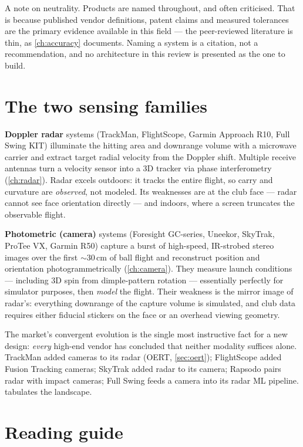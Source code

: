 \begin{keypoint}
A note on neutrality. Products are named throughout, and often criticised.
That is because published vendor definitions, patent claims and measured
tolerances are the primary evidence available in this field --- the
peer-reviewed literature is thin, as \cref{ch:accuracy} documents. Naming a
system is a citation, not a recommendation, and no architecture in this
review is presented as the one to build.
\end{keypoint}

\section{The two sensing families}

\textbf{Doppler radar} systems (TrackMan, FlightScope, Garmin Approach R10,
Full Swing KIT) illuminate the hitting area and downrange volume with a
microwave carrier and extract target radial velocity from the Doppler shift.
Multiple receive antennas turn a velocity sensor into a 3D tracker via phase
interferometry (\cref{ch:radar}). Radar excels outdoors: it tracks the
entire flight, so carry and curvature are \emph{observed}, not modeled. Its
weaknesses are at the club face --- radar cannot see face orientation
directly --- and indoors, where a screen truncates the observable flight.

\textbf{Photometric (camera)} systems (Foresight GC-series, Uneekor,
SkyTrak, ProTee VX, Garmin R50) capture a burst of high-speed, IR-strobed
stereo images over the first $\sim$30\,cm of ball flight and reconstruct
position and orientation photogrammetrically (\cref{ch:camera}). They
measure launch conditions --- including 3D spin from dimple-pattern rotation
--- essentially perfectly for simulator purposes, then \emph{model} the
flight. Their weakness is the mirror image of radar's: everything downrange
of the capture volume is simulated, and club data requires either fiducial
stickers on the face or an overhead viewing geometry.

The market's convergent evolution is the single most instructive fact for a
new design: \emph{every} high-end vendor has concluded that neither modality
suffices alone. TrackMan added cameras to its radar (OERT, \cref{sec:oert});
FlightScope added Fusion Tracking cameras; SkyTrak added radar to its
camera; Rapsodo pairs radar with impact cameras; Full Swing feeds a camera
into its radar ML pipeline.  tabulates the landscape.

\section{Reading guide}

